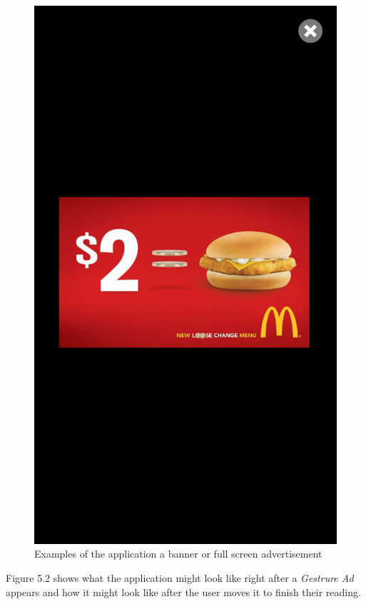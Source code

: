 \begin{figure}
\begin{center}
\includegraphics[scale=0.25]{Images/classicalad_fullscreen.png}
\caption{Examples of the application a banner or full screen advertisement}
\label{fig:ads1}
\end{center}
\end{figure}

Figure 5.2 shows what the application might look like right after a \textit{Gestrure Ad} appears and how it might look like after the user moves it to finish their reading.

